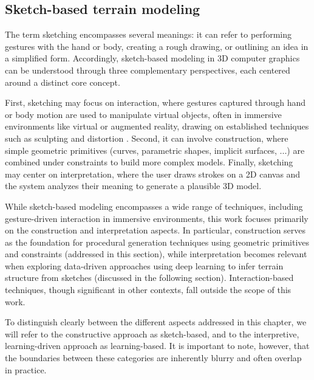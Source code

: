 


\subsection{Sketch-based terrain modeling}
\label{sec:coral-island-sota-sketches}

The term sketching encompasses several meanings: it can refer to performing gestures with the hand or body, creating a rough drawing, or outlining an idea in a simplified form. Accordingly, sketch-based modeling in 3D computer graphics can be understood through three complementary perspectives, each centered around a distinct core concept.

First, sketching may focus on interaction, where gestures captured through hand or body motion are used to manipulate virtual objects, often in immersive environments like virtual or augmented reality, drawing on established techniques such as sculpting and distortion \cite{Olsen2009, Cook2009}. Second, it can involve construction, where simple geometric primitives (curves, parametric shapes, implicit surfaces, ...) are combined under constraints to build more complex models. Finally, sketching may center on interpretation, where the user draws strokes on a 2D canvas and the system analyzes their meaning to generate a plausible 3D model.

While sketch-based modeling encompasses a wide range of techniques, including gesture-driven interaction in immersive environments, this work focuses primarily on the construction and interpretation aspects. In particular, construction serves as the foundation for procedural generation techniques using geometric primitives and constraints (addressed in this section), while interpretation becomes relevant when exploring data-driven approaches using deep learning to infer terrain structure from sketches (discussed in the following section). Interaction-based techniques, though significant in other contexts, fall outside the scope of this work. 

To distinguish clearly between the different aspects addressed in this chapter, we will refer to the constructive approach as sketch-based, and to the interpretive, learning-driven approach as learning-based. It is important to note, however, that the boundaries between these categories are inherently blurry and often overlap in practice.

